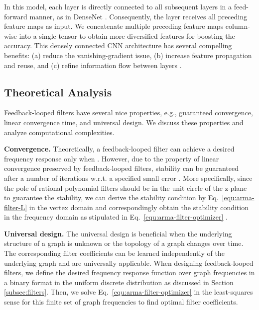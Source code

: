 \documentclass{article}
\begin{document}
In this model, each layer is directly connected to all subsequent layers in a feed-forward manner, as in DenseNet \cite{huang2017densely}. Consequently, the  layer receives all preceding feature maps  as input. We concatenate multiple preceding feature maps column-wise into a single tensor to obtain more diversified features for boosting the accuracy. This densely connected CNN architecture has several compelling benefits: (a) reduce the vanishing-gradient issue, (b) increase feature propagation and reuse, and (c) refine information flow between layers  \cite{huang2017densely}. 

\begin{comment}
\begin{figure}[h]
    \centering
    \texttt{[image: images/first\_model\_v5.png]}
    \caption{Densely connected spectral ARMA convnets architecture with 3 ARMA layers (8, 16, 32 nodes respectively) followed by a softmax layer.}
    \label{fig:firstModel}
\end{figure}
\end{comment}

\subsection{Theoretical Analysis}\label{subsec:theoretical-properties}
Feedback-looped filters have several nice properties, e.g., guaranteed convergence, linear convergence time, and universal design. We discuss these properties and analyze computational complexities.  

\noindent\textbf{Convergence. } Theoretically, a feedback-looped filter can achieve a desired frequency response only when  \cite{isufi2017autoregressive1}. However, due to the property of linear convergence preserved by feedback-looped filters, stability can be guaranteed after a number of iterations w.r.t. a specified small error \cite{isufi2017autoregressive2}. More specifically, since the pole of rational polynomial filters should be in the unit circle of the z-plane to guarantee the stability, we can derive the stability condition  by  Eq.~\ref{equ:arma-filter-L} in the vertex domain and correspondingly obtain the stability condition  in the frequency domain as stipulated in Eq.~\ref{equ:arma-filter-optimizer} \cite{isufi2017autoregressive2}.








\noindent\textbf{Universal design. } 
The universal design is beneficial when the underlying structure of a graph is unknown or the topology of a graph changes over time. The corresponding filter coefficients can be learned independently of the underlying graph and are universally applicable. When designing feedback-looped filters, we define the desired frequency response function  over graph frequencies  in a binary format in the uniform discrete distribution as discussed in Section \ref{subsec:filters}. Then, we solve Eq.~\ref{equ:arma-filter-optimizer} in the least-squares sense for this finite set of graph frequencies to find optimal filter coefficients.
\end{document}
